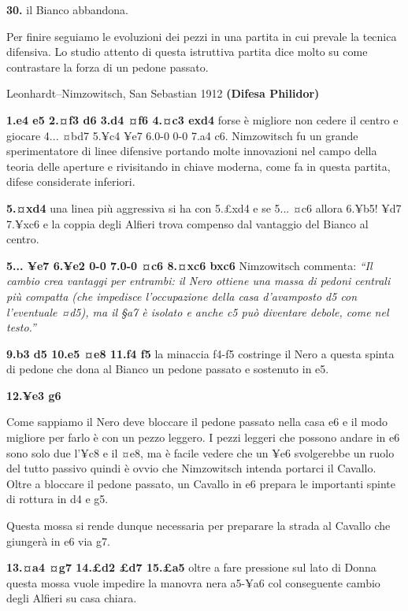 \textbf{30.} il Bianco abbandona.


Per finire seguiamo le evoluzioni dei pezzi in una partita in cui
prevale la tecnica difensiva. Lo studio attento di questa istruttiva
partita dice molto su come contrastare la forza di un pedone passato.

Leonhardt--Nimzowitsch, San Sebastian 1912 \textbf{(Difesa Philidor)}

\textbf{1.e4 e5 2.¤f3 d6 3.d4 ¤f6 4.¤c3 exd4} forse è migliore non
cedere il centro e giocare 4... ¤bd7 5.¥c4 ¥e7 6.0-0 0-0 7.a4 c6.
Nimzowitsch fu un grande sperimentatore di linee difensive portando
molte innovazioni nel campo della teoria delle aperture e rivisitando in
chiave moderna, come fa in questa partita, difese considerate inferiori.

\textbf{5.¤xd4} una linea più aggressiva si ha con 5.£xd4 e se 5... ¤c6
allora 6.¥b5! ¥d7 7.¥xc6 e la coppia degli Alfieri trova compenso dal
vantaggio del Bianco al centro.

\textbf{5... ¥e7 6.¥e2 0-0 7.0-0 ¤c6 8.¤xc6 bxc6} Nimzowitsch commenta:
\emph{``Il cambio crea vantaggi per entrambi: il Nero ottiene una massa
di pedoni centrali più compatta (che impedisce l'occupazione della casa
d'avamposto d5 con l'eventuale ¤d5), ma il §a7 è isolato e anche c5 può
diventare debole, come nel testo.''}

\textbf{9.b3 d5 10.e5 ¤e8 11.f4 f5} la minaccia f4-f5 costringe il Nero
a questa spinta di pedone che dona al Bianco un pedone passato e
sostenuto in e5.

\textbf{12.¥e3 g6}


Come sappiamo il Nero deve bloccare il pedone passato nella casa e6 e il
modo migliore per farlo è con un pezzo leggero. I pezzi leggeri che
possono andare in e6 sono solo due l'¥c8 e il ¤e8, ma è facile vedere
che un ¥e6 svolgerebbe un ruolo del tutto passivo quindi è ovvio che
Nimzowitsch intenda portarci il Cavallo. Oltre a bloccare il pedone
passato, un Cavallo in e6 prepara le importanti spinte di rottura in d4
e g5.

Questa mossa si rende dunque necessaria per preparare la strada al
Cavallo che giungerà in e6 via g7.

\textbf{13.¤a4 ¤g7 14.£d2 £d7 15.£a5} oltre a fare pressione sul lato di
Donna questa mossa vuole impedire la manovra nera a5-¥a6 col conseguente
cambio degli Alfieri su casa chiara.

